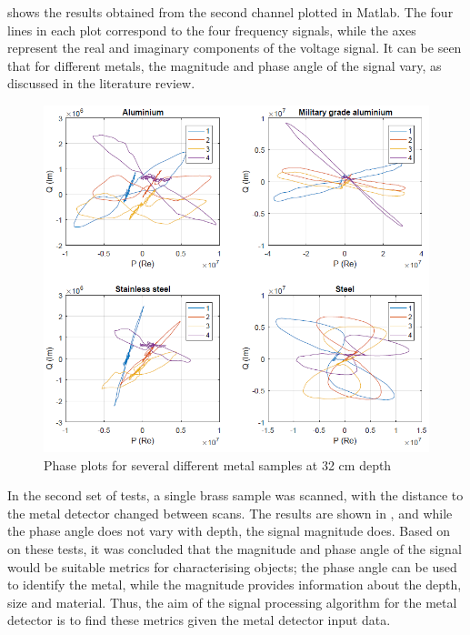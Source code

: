 \documentclass[main.tex]{subfiles}
\begin{document}
 shows the results obtained from the second channel plotted in Matlab.    The four lines in each plot correspond to the four frequency signals, while the axes represent the real and imaginary components of the voltage signal. It can be seen that for different metals, the magnitude and phase angle of the signal vary, as discussed in the literature review. 

\begin{figure}[ht]
\includegraphics[width=\textwidth]{3-ConceptDesign/metals.PNG}
\centering
\caption{Phase plots for several different metal samples at 32 cm depth} 
\end{figure}

In the second set of tests, a single brass sample was scanned, with the distance to the metal detector changed between scans. The results are shown in , and while the phase angle does not vary with depth, the signal magnitude does. Based on on these tests,   it was concluded that the magnitude and phase angle of the signal would be suitable metrics for characterising objects; the phase angle can be used to identify the metal, while the magnitude provides information about the depth, size and material. Thus, the aim of the signal processing algorithm for the metal detector is to find these metrics given the metal detector input data. 
\end{document}
